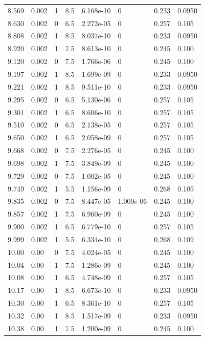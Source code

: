 \documentclass[preview]{standalone}
\begin{document}
{{{\begin{tabular}{L{1.2cm}C{1.2cm} C{0.3cm}C{0.5cm} C{1.4cm}C{1.4cm} C{1.4cm}C{1.4cm}}
  8.569  &  0.002  & 1     & 8.5 &  6.168e-10  & 0  & 0.233 &  0.0950   \\ 
  8.630  &  0.002  & 0     & 6.5 &  2.272e-05  & 0  & 0.257 &  0.105   \\ 
  8.808  &  0.002  & 1     & 8.5 &  8.037e-10  & 0  & 0.233 &  0.0950   \\ 
  8.920  &  0.002  & 1     & 7.5 &  8.613e-10  & 0  & 0.245 &  0.100   \\ 
  9.120  &  0.002  & 0     & 7.5 &  1.766e-06  & 0  & 0.245 &  0.100   \\ 
  9.197  &  0.002  & 1     & 8.5 &  1.699e-09  & 0  & 0.233 &  0.0950   \\ 
  9.221  &  0.002  & 1     & 8.5 &  9.511e-10  & 0  & 0.233 &  0.0950   \\ 
  9.295  &  0.002  & 0     & 6.5 &  5.130e-06  & 0  & 0.257 &  0.105   \\ 
  9.301  &  0.002  & 1     & 6.5 &  8.606e-10  & 0  & 0.257 &  0.105   \\ 
  9.510  &  0.002  & 0     & 6.5 &  2.138e-05  & 0  & 0.257 &  0.105   \\ 
  9.650  &  0.002  & 1     & 6.5 &  2.058e-09  & 0  & 0.257 &  0.105   \\ 
  9.668  &  0.002  & 0     & 7.5 &  2.276e-05  & 0  & 0.245 &  0.100   \\ 
  9.698  &  0.002  & 1     & 7.5 &  3.849e-09  & 0  & 0.245 &  0.100   \\ 
  9.729  &  0.002  & 0     & 7.5 &  1.002e-05  & 0  & 0.245 &  0.100   \\ 
  9.749  &  0.002  & 1     & 5.5 &  1.156e-09  & 0  & 0.268 &  0.109   \\ 
  9.835  &  0.002  & 0     & 7.5 &  8.447e-05  & 1.000e-06  & 0.245 &  0.100   \\ 
  9.857  &  0.002  & 1     & 7.5 &  6.960e-09  & 0  & 0.245 &  0.100   \\ 
  9.900  &  0.002  & 1     & 6.5 &  6.779e-10  & 0  & 0.257 &  0.105   \\ 
  9.999  &  0.002  & 1     & 5.5 &  6.334e-10  & 0  & 0.268 &  0.109   \\ 
  10.00  &  0.00  & 0     & 7.5 &  4.024e-05  & 0  & 0.245 &  0.100   \\ 
  10.04  &  0.00  & 1     & 7.5 &  1.286e-09  & 0  & 0.245 &  0.100   \\ 
  10.08  &  0.00  & 1     & 6.5 &  4.748e-09  & 0  & 0.257 &  0.105   \\ 
  10.17  &  0.00  & 1     & 8.5 &  6.673e-10  & 0  & 0.233 &  0.0950   \\ 
  10.30  &  0.00  & 1     & 6.5 &  8.361e-10  & 0  & 0.257 &  0.105   \\ 
  10.32  &  0.00  & 1     & 8.5 &  1.517e-09  & 0  & 0.233 &  0.0950   \\ 
  10.38  &  0.00  & 1     & 7.5 &  1.200e-09  & 0  & 0.245 &  0.100   \\ 
\hline 
\end{tabular} 

}}}
\end{document}

